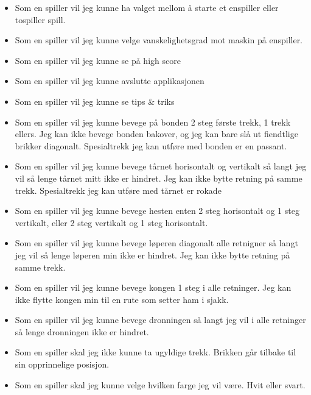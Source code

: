 \documentclass{article}
\begin{document}
\maketitle

\begin{itemize}
	\item	Som en spiller vil jeg kunne ha valget mellom å starte et enspiller eller tospiller spill.
	\item	Som en spiller vil jeg kunne velge vanskelighetsgrad mot maskin på enspiller.
	\item	Som en spiller vil jeg kunne se på high score
	\item	Som en spiller vil jeg kunne avslutte applikasjonen
	\item	Som en spiller vil jeg kunne se tips \& triks
	\item	Som en spiller vil jeg kunne bevege på bonden 2 steg første trekk, 1 trekk ellers. Jeg kan ikke bevege bonden bakover, og jeg kan bare slå ut fiendtlige 			brikker diagonalt. Spesialtrekk jeg kan utføre med bonden er en passant.
	\item	Som en spiller vil jeg kunne bevege tårnet horisontalt og vertikalt så langt jeg vil så lenge tårnet mitt ikke er hindret. Jeg kan ikke bytte retning på samme 			trekk. Spesialtrekk jeg kan utføre med tårnet er rokade
	\item	Som en spiller vil jeg kunne bevege hesten enten 2 steg horisontalt og 1 steg vertikalt, eller 2 steg vertikalt og 1 steg horisontalt.
	\item	Som en spiller vil jeg kunne bevege løperen diagonalt alle retnigner så langt jeg vil så lenge løperen min ikke er hindret. Jeg kan ikke bytte retning på 				samme trekk.
	\item	Som en spiller vil jeg kunne bevege kongen 1 steg i alle retninger. Jeg kan ikke flytte kongen min til en rute som setter ham i sjakk.
	\item	Som en spiller vil jeg kunne bevege dronningen så langt jeg vil i alle retninger så lenge dronningen ikke er hindret.
	\item	Som en spiller skal jeg ikke kunne ta ugyldige trekk. Brikken går tilbake til sin opprinnelige posisjon.
	\item	Som en spiller skal jeg kunne velge hvilken farge jeg vil være. Hvit eller svart.
\end{itemize}
\end{document}
